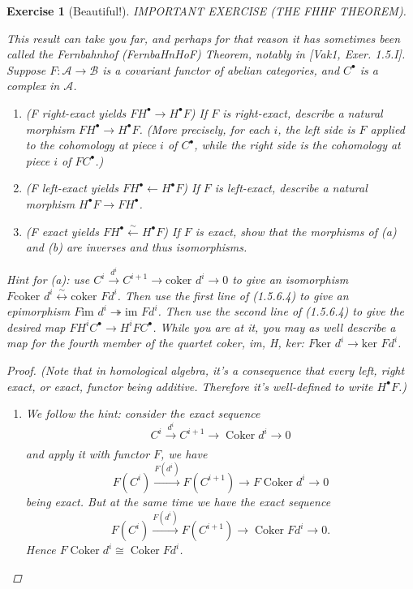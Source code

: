 \documentclass{article}
\theoremstyle{breakstyle}
\newtheorem{exercise}{Exercise}[section]
\DeclareMathOperator{\coker}{Coker}
\begin{document}
\begin{exercise}[Beautiful!]
IMPORTANT EXERCISE (THE FHHF THEOREM).

This result can take you far, and perhaps for that reason it has sometimes
been called the Fernbahnhof (FernbaHnHoF) Theorem, notably in [Vak1, Exer.
1.5.I]. Suppose $F: \mathcal{A} \to \mathcal{B}$ is a covariant functor of
abelian categories, and $C^{\bullet}$ is a complex in $\mathcal{A}$.

\begin{enumerate}[label=({\alph*})]
\item (F right-exact yields $FH^{\bullet} \longrightarrow H^{\bullet}F$)
    If $F$ is right-exact, describe a natural morphism $FH^{\bullet}
    \rightarrow H^{\bullet}F$. (More precisely, for each $i$, the left side
    is $F$ applied to the cohomology at piece $i$ of $C^{\bullet}$, while
    the right side is the cohomology at piece $i$ of $FC^{\bullet}$.)
\item (F left-exact yields $FH^{\bullet} \leftarrow H^{\bullet}F$) If $F$
    is left-exact, describe a natural morphism $H^{\bullet}F \rightarrow
    FH^{\bullet}$.
\item (F exact yields $FH^{\bullet} \xleftarrow{\sim} H^{\bullet}F$) If $F$
    is exact, show that the morphisms of (a) and (b) are inverses and thus
    isomorphisms.
\end{enumerate}

Hint for (a): use $C^i \xrightarrow{d^i} C^{i+1} \longrightarrow
\text{coker } d^i \longrightarrow 0$ to give an isomorphism $F \text{coker }
d^i \stackrel{\sim}{\leftrightarrow} \text{coker } F d^i$. Then use the first line of
(1.5.6.4) to give an epimorphism $F \text{im } d^i \twoheadrightarrow
\text{im } F d^i$. Then use the second line of (1.5.6.4) to give the
desired map $FH^i C^\bullet \to H^i FC^\bullet$. While you are at it, you
may as well describe a map for the fourth member of the quartet {coker, im,
H, ker}: $F \text{ker } d^i \to \text{ker } F d^i$.

\begin{proof}
    \emph{(Note that in homological algebra, it's a consequence that every left,
    right exact, or exact, functor being additive. Therefore it's well-defined
    to write} $H^{\bullet}F$\emph{.)}

    \begin{enumerate}[label=({\roman*})]
        \item 
            We follow the hint: consider the exact sequence
            $$
            C^{i}\xrightarrow[]{d^{i}} C^{i+1}\longrightarrow
            \coker{d^{i}}\longrightarrow 0
            $$
            and apply it with functor $F$, we have
            $$
            F\left( C^{i} \right) \xrightarrow[]{F\left( d^{i} \right) } F\left(
            C^{i+1} \right) \longrightarrow F\coker{d^{i}}\longrightarrow 0
            $$
            being exact. But at the same time we have the exact sequence
            $$
            F\left( C^{i} \right) \xrightarrow[]{F\left( d^{i} \right) } F\left(
            C^{i+1} \right) \longrightarrow \coker{F{d^{i}}}\longrightarrow 0
            .$$
            Hence $F{\coker{d^{i}}}\cong \coker{F{d^{i}}}$.


\end{enumerate}
\end{proof}
\end{exercise}
\end{document}
